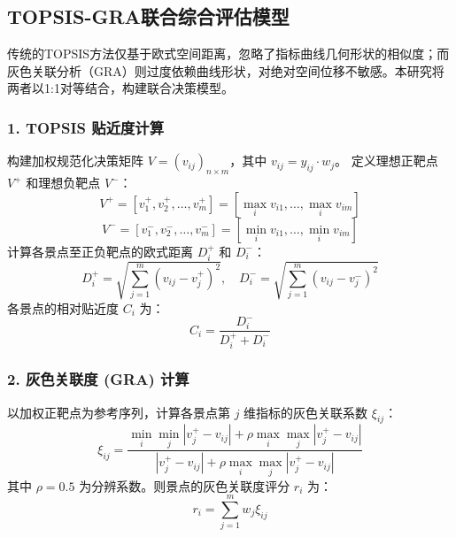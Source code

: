 \documentclass{cumcmthesis}
\begin{document}
\subsection{TOPSIS-GRA联合综合评估模型}
传统的TOPSIS方法仅基于欧式空间距离，忽略了指标曲线几何形状的相似度；而灰色关联分析（GRA）则过度依赖曲线形状，对绝对空间位移不敏感。本研究将两者以1:1对等结合，构建联合决策模型\cite{ref9, ref10}。
\subsubsection{1. TOPSIS 贴近度计算}
构建加权规范化决策矩阵 $V = (v_{ij})_{n \times m}$，其中 $v_{ij} = y_{ij} \cdot w_j$。
定义理想正靶点 $V^+$ 和理想负靶点 $V^-$：
\begin{equation}
V^+ = [v_1^+, v_2^+, \dots, v_m^+] = [\max_i v_{i1}, \dots, \max_i v_{im}]
\end{equation}
\begin{equation}
V^- = [v_1^-, v_2^-, \dots, v_m^-] = [\min_i v_{i1}, \dots, \min_i v_{im}]
\end{equation}
计算各景点至正负靶点的欧式距离 $D_i^+$ 和 $D_i^-$：
\begin{equation}
D_i^+ = \sqrt{\sum_{j=1}^{m} (v_{ij} - v_j^+)^2}, \quad D_i^- = \sqrt{\sum_{j=1}^{m} (v_{ij} - v_j^-)^2}
\end{equation}
各景点的相对贴近度 $C_i$ 为：
\begin{equation}
C_i = \frac{D_i^-}{D_i^+ + D_i^-}
\end{equation}
\subsubsection{2. 灰色关联度 (GRA) 计算}
以加权正靶点为参考序列，计算各景点第 $j$ 维指标的灰色关联系数 $\xi_{ij}$：
\begin{equation}
\xi_{ij} = \frac{\min_i \min_j |v_j^+ - v_{ij}| + \rho \max_i \max_j |v_j^+ - v_{ij}|}{|v_j^+ - v_{ij}| + \rho \max_i \max_j |v_j^+ - v_{ij}|}
\end{equation}
其中 $\rho = 0.5$ 为分辨系数。则景点的灰色关联度评分 $r_i$ 为：
\begin{equation}
r_i = \sum_{j=1}^{m} w_j \xi_{ij}
\end{equation}
\end{document}
